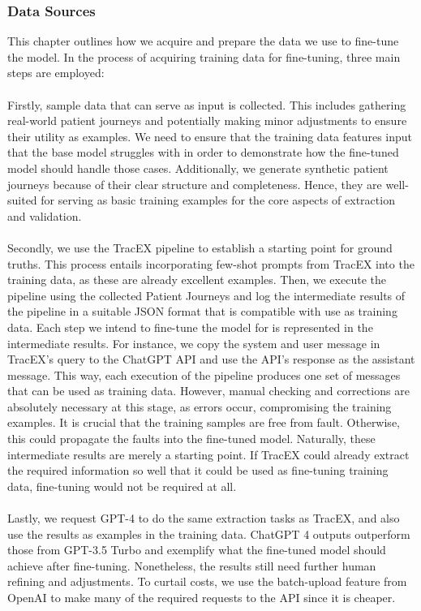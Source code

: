 \subsubsection{Data Sources}\label{sec:data_sources}
This chapter outlines how we acquire and prepare the data we use to fine-tune the model. In the process of acquiring training data for fine-tuning, three main steps are employed:\\\\
Firstly, sample data that can serve as input is collected. This includes gathering real-world patient journeys and potentially making minor adjustments to ensure their utility as examples. We need to ensure that the training data features input that the base model struggles with in order to demonstrate how the fine-tuned model should handle those cases. Additionally, we generate synthetic patient journeys because of their clear structure and completeness. Hence, they are well-suited for serving as basic training examples for the core aspects of extraction and validation.\\\\
Secondly, we use the TracEX pipeline to establish a starting point for ground truths. This process entails incorporating few-shot prompts from TracEX into the training data, as these are already excellent examples. Then, we execute the pipeline using the collected Patient Journeys and log the intermediate results of the pipeline in a suitable JSON format that is compatible with use as training data. Each step we intend to fine-tune the model for is represented in the intermediate results. For instance, we copy the system and user message in TracEX's query to the ChatGPT API and use the API's response as the assistant message. This way, each execution of the pipeline produces one set of messages that can be used as training data. However, manual checking and corrections are absolutely necessary at this stage, as errors occur, compromising the training examples. It is crucial that the training samples are free from fault. Otherwise, this could propagate the faults into the fine-tuned model. Naturally, these intermediate results are merely a starting point. If TracEX could already extract the required information so well that it could be used as fine-tuning training data, fine-tuning would not be required at all.\\\\
Lastly, we request GPT-4 to do the same extraction tasks as TracEX, and also use the results as examples in the training data. ChatGPT 4 outputs outperform those from GPT-3.5 Turbo and exemplify what the fine-tuned model should achieve after fine-tuning. Nonetheless, the results still need further human refining and adjustments. To curtail costs, we use the batch-upload feature from OpenAI to make many of the required requests to the API since it is cheaper.


